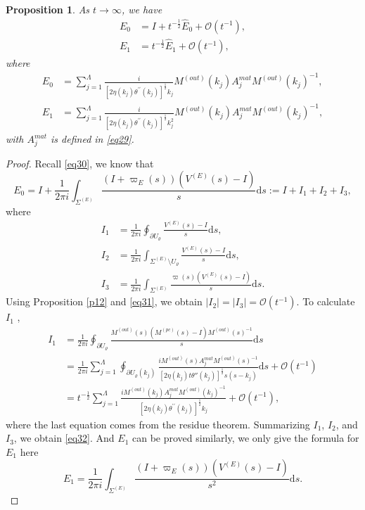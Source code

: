 \documentclass[11pt]{article}
\numberwithin{equation}{section}
\newtheorem{Proposition}{Proposition}
\begin{document}
\begin{Proposition}\label{p16}
    As $t\to\infty$, we have
    \begin{align}
     E_0&=I+t^{-\frac{1}{2}}\widehat E_0 + \mathcal{O}(t^{-1}),\label{eq32}\\
        E_1&=t^{-\frac{1}{2}}\widehat E_1+\mathcal{O}(t^{-1}),
    \end{align}
    where
    \begin{align}
       \widehat E_0&= \sum_{j=1}^\Lambda \frac{i  }{\left[2  \eta(k_j)  \theta^{\prime\prime}(k_j)\right]^{\frac{1}{2}} k_j}M^{(out)}(k_j)A_j^{mat}M^{(out)}(k_j)^{-1},\\
    \widehat E_1&=\sum_{j=1}^\Lambda \frac{i  }{\left[2  \eta(k_j) \theta^{\prime\prime}(k_j)\right]^{\frac{1}{2}} k_j^2}M^{(out)}(k_j)A_j^{mat}M^{(out)}(k_j)^{-1},
    \end{align}
    with $A_j^{mat}$ is defined in \eqref{eq29}.
\end{Proposition}
\begin{proof}
    Recall \eqref{eq30}, we know that
    \begin{equation}
        E_0=I+\frac{1}{2\pi i}\int_{\Sigma^{(E)}}\frac{(I + \varpi_E(s))(V^{(E)}(s) - I)}{s} \mathrm{d}s:=I+I_1+I_2+I_3,
    \end{equation}
where
\begin{align}
I_1 &= \frac{1}{2\pi i} \oint_{\partial U_\varrho} \frac{V^{(E)}(s) - I }{s}\mathrm{d}s,\\
I_2 &= \frac{1}{2\pi i} \int_{\Sigma^{(E)} \setminus U_\varrho} \frac{V^{(E)}(s) - I }{s}\mathrm{d}s,\\
I_3& = \frac{1}{2\pi i} \int_{\Sigma^{(E)}}  \frac{\varpi(s)\left(V^{(E)}(s) - I\right) }{s} \mathrm{d}s.
\end{align}
Using Proposition \ref{p12} and \eqref{eq31}, we obtain $|I_2| =|I_3|= \mathcal{O}(t^{-1})$.
To calculate $I_1$ ,
\begin{align*}
    I_1 &= \frac{1}{2\pi i} \oint_{\partial U_{\varrho}} \frac{M^{(out)}(s) \left( M^{(pc)}(s) - I \right) M^{(out)}(s)^{-1}}{s} \mathrm{d}s\\
&= \frac{1}{2\pi i} \sum_{j=1}^\Lambda \oint_{\partial U_{\varrho}(k_j)} \frac{i M^{(out)}(s) A_j^{mat}M^{(out)}(s)^{-1}}{\left[2\eta(k_j)t \theta''(k_j)\right]^{\frac{1}{2}} s(s - k_j)}  \mathrm{d}s
+ \mathcal{O}(t^{-1})\\
&=t^{-\frac{1}{2}}\sum_{j=1}^\Lambda \frac{iM^{(out)}(k_j)A_j^{mat}M^{(out)}(k_j)^{-1} }{\left[2 \eta(k_j)  \theta^{\prime\prime}(k_j)\right]^{\frac{1}{2}} k_j} + \mathcal{O}(t^{-1}),
\end{align*}
where the last equation comes from the residue theorem. Summarizing $I_1$, $I_2$, and $I_3$, we obtain \eqref{eq32}. And $E_1$ can be proved similarly, we only give the formula for $E_1$ here
\begin{equation*}
        E_1=\frac{1}{2\pi i}\int_{\Sigma^{(E)}}\frac{(I + \varpi_E(s))(V^{(E)}(s) - I)}{s^2} \mathrm{d}s.
    \end{equation*}


\end{proof}
\end{document}
